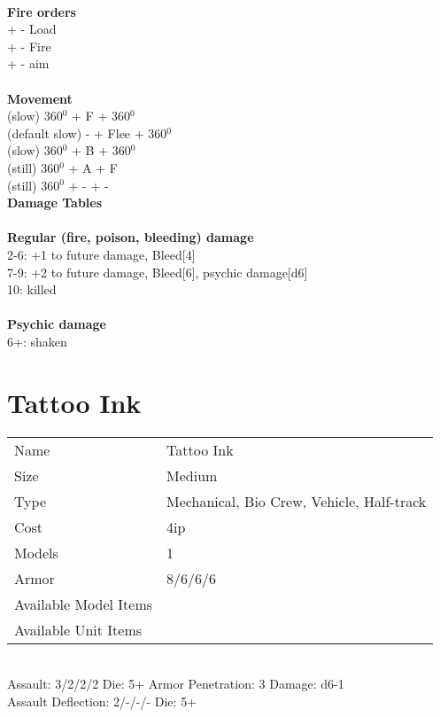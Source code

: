 \ \\ {\bf Fire orders } \\
+ - Load \\
+ - Fire \\
+ - aim \\
\ \\ {\bf Movement } \\
(slow) 360$^0$ + F + 360$^0$ \\
(default slow) - + Flee + 360$^0$ \\
(slow) 360$^0$ + B + 360$^0$ \\
(still) 360$^0$ + A + F \\
(still) 360$^0$ + - + - \\



{\bf Damage Tables} \\
\ \\ {\bf Regular (fire, poison, bleeding) damage } \\
2-6: +1 to future damage, Bleed[4] \\
7-9: +2 to future damage, Bleed[6], psychic damage[d6] \\
10: killed \\
\ \\ {\bf Psychic damage } \\
6+: shaken \\









\pagebreak

\section{ Tattoo Ink }

\begin{tabular}{ll}
  Name & Tattoo Ink \\
  Size & Medium\\
  Type & Mechanical, Bio Crew, Vehicle, Half-track\\
  Cost & 4ip\\
  Models & 1\\
  Armor & 8/6/6/6\\
  Available Model Items &  \\
  Available Unit Items &  \\
\end{tabular}

\ \\
Assault: 3/2/2/2 Die: 5+ Armor Penetration: 3 Damage: d6-1 \\
Assault Deflection: 2/-/-/- Die: 5+\\
\indent  \\
\ \\

